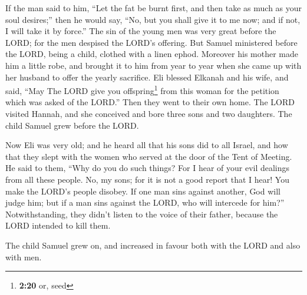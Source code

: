  If the man said to him, ``Let the fat be burnt first,
and then take as much as your soul desires;'' then he would say, ``No,
but you shall give it to me now; and if not, I will take it by force.''
 The sin of the young men was very great before the LORD;
for the men despised the LORD's offering.  But Samuel
ministered before the LORD, being a child, clothed with a linen ephod.
 Moreover his mother made him a little robe, and brought
it to him from year to year when she came up with her husband to offer
the yearly sacrifice.  Eli blessed Elkanah and his wife,
and said, ``May The LORD give you offspring\footnote{\textbf{2:20} or,
  seed} from this woman for the petition which was asked of the LORD.''
Then they went to their own home.  The LORD visited
Hannah, and she conceived and bore three sons and two daughters. The
child Samuel grew before the LORD.

 Now Eli was very old; and he heard all that his sons did
to all Israel, and how that they slept with the women who served at the
door of the Tent of Meeting.  He said to them, ``Why do
you do such things? For I hear of your evil dealings from all these
people.  No, my sons; for it is not a good report that I
hear! You make the LORD's people disobey.  If one man
sins against another, God will judge him; but if a man sins against the
LORD, who will intercede for him?'' Notwithstanding, they didn't listen
to the voice of their father, because the LORD intended to kill them.

 The child Samuel grew on, and increased in favour both
with the LORD and also with men.

